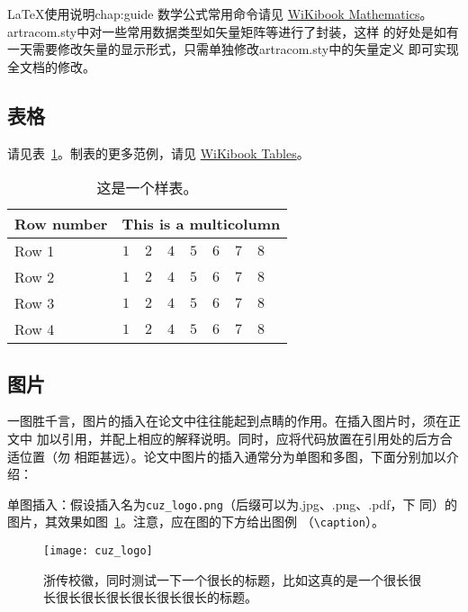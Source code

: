 \begin{cuzchapter}{\LaTeX{}使用说明}{chap:guide}
	数学公式常用命令请见
	\href{https://en.wikibooks.org/wiki/LaTeX/Mathematics}{WiKibook
		Mathematics}。 artracom.sty中对一些常用数据类型如矢量矩阵等进行了封装，这样
	的好处是如有一天需要修改矢量的显示形式，只需单独修改artracom.sty中的矢量定义
	即可实现全文档的修改。

	\subsection{表格}\label{sub:tables}

	请见表~\ref{tab:sample}。制表的更多范例，请见
	\href{https://en.wikibooks.org/wiki/LaTeX/Tables}{WiKibook Tables}。
	\begin{table}[!htbp]
		\caption[样表]{这是一个样表。}
		\label{tab:sample}
		\centering
		\footnotesize%
		\setlength{\tabcolsep}{4pt}%
		\renewcommand{\arraystretch}{1.2}%
		\begin{tabular}{lcccccccc}
			\hline
			Row number & \multicolumn{8}{c}{This is a multicolumn}                                     \\
			\hline
			Row 1      & $1$                                       & $2$ & $4$ & $5$ & $6$ & $7$ & $8$ \\
			Row 2      & $1$                                       & $2$ & $4$ & $5$ & $6$ & $7$ & $8$ \\
			Row 3      & $1$                                       & $2$ & $4$ & $5$ & $6$ & $7$ & $8$ \\
			Row 4      & $1$                                       & $2$ & $4$ & $5$ & $6$ & $7$ & $8$ \\
			\hline
		\end{tabular}
	\end{table}

	\subsection{图片}\label{sub:images}

	一图胜千言，图片的插入在论文中往往能起到点睛的作用。在插入图片时，须在正文中
	加以引用，并配上相应的解释说明。同时，应将代码放置在引用处的后方合适位置（勿
	相距甚远）。论文中图片的插入通常分为单图和多图，下面分别加以介绍：

	单图插入：假设插入名为\verb|cuz_logo.png|（后缀可以为.jpg、.png、.pdf，下
	同）的图片，其效果如图~\ref{fig:cuz_logo}。注意，应在图的下方给出图例
	（\verb|\caption|）。
	\begin{figure}[h]
		\centering
		\texttt{[image: cuz\_logo]}
		\caption[浙传校徽]{浙传校徽，同时测试一下一个很长的标题，比如这真的是一个很长很长很长很长很长很长很长很长的标题。}
		\label{fig:cuz_logo}
	\end{figure}


\end{cuzchapter}
